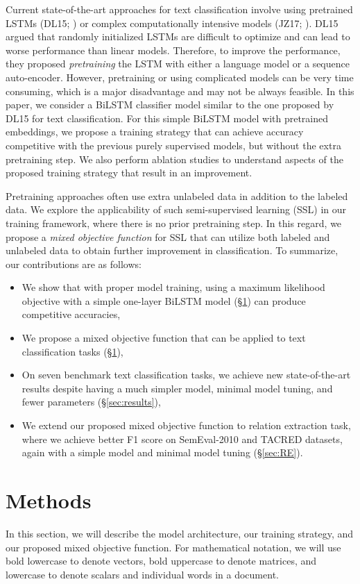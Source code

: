 \documentclass[letterpaper]{article}
\newcommand{\citealp}[1]{\citeauthor{#1} \citeyear{#1}}
\begin{document}
Current state-of-the-art approaches for text classification involve using pretrained LSTMs (DL15; \citealp{dai2015semi}) or complex computationally intensive models (JZ17; \citealp{johnson2017deep}). DL15 argued that randomly initialized LSTMs are difficult to optimize and can lead to worse performance than linear models. Therefore, to improve the performance, they proposed \emph{pretraining} the LSTM with either a language model or a sequence auto-encoder. However, pretraining or using complicated models can be very time consuming, which is a major disadvantage and may not be always feasible. In this paper, we consider a BiLSTM classifier model similar to the one proposed by DL15 for text classification. For this simple BiLSTM model with pretrained embeddings, we propose a training strategy that can achieve accuracy competitive with the previous purely supervised models, but without the extra pretraining step. We also perform ablation studies to understand aspects of the proposed training strategy that result in an improvement.

Pretraining approaches often use extra unlabeled data in addition to the labeled data. 
We explore the applicability of such semi-supervised learning (SSL) in our training framework, where there is no prior pretraining step.
In this regard, we propose a \emph{mixed objective function} for SSL that can utilize both labeled and unlabeled data to obtain further improvement in classification. To summarize, our contributions are as follows:
\begin{itemize}
\itemsep0em
\item We show that with proper model training, using a maximum likelihood objective with a simple one-layer BiLSTM model (\S\ref{sec:methods}) can produce competitive accuracies,
\item We propose a mixed objective function that can be applied to text classification tasks (\S\ref{sec:methods}),
\item On seven benchmark text classification tasks, we achieve new state-of-the-art results despite having a much simpler model, minimal model tuning, and fewer parameters (\S\ref{sec:results}),
\item We extend our proposed mixed objective function to relation extraction task, where we achieve better F1 score on SemEval-2010 and TACRED datasets, again with a simple model and minimal model tuning (\S\ref{sec:RE}).
\end{itemize}

\section{Methods} \label{sec:methods}
In this section, we will describe the model architecture, our training strategy, and our proposed mixed objective function. 
For mathematical notation, we will use bold lowercase to denote vectors, bold uppercase to denote matrices, and lowercase to denote scalars and individual words in a document.
\end{document}
